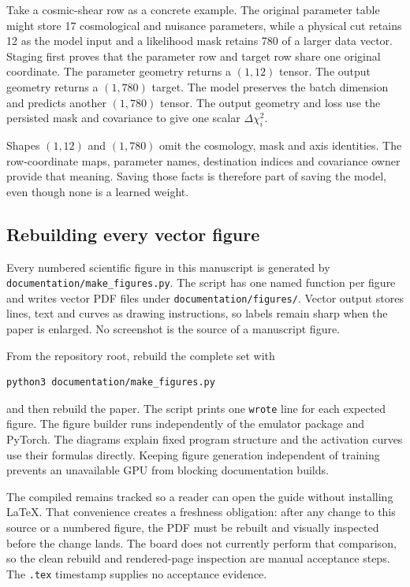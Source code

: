 \documentclass[10pt,aps,prd,twocolumn,nofootinbib]{revtex4-2}
\newcommand{\code}[1]{\texttt{#1}}
\begin{document}
Take a cosmic-shear row as a concrete example.  The original parameter table
might store 17 cosmological and nuisance parameters, while a physical cut
retains 12 as the model input and a likelihood mask retains 780 of a larger
data vector.  Staging first proves that the parameter row and target row share
one original coordinate.  The parameter geometry returns a $(1,12)$ tensor.
The output geometry returns a $(1,780)$ target.  The model preserves the batch
dimension and predicts another $(1,780)$ tensor.  The output geometry and
loss use the persisted mask and covariance to give one scalar
$\Delta\chi_i^2$.

Shapes $(1,12)$ and $(1,780)$ omit the cosmology, mask and axis identities.
The row-coordinate maps, parameter names, destination indices and covariance
owner provide that meaning.  Saving those facts is therefore part of saving
the model, even though none is a learned weight.

\subsection{Rebuilding every vector figure}

Every numbered scientific figure in this manuscript is generated by
\code{documentation/make\_figures.py}.  The script has one named function per
figure and writes vector PDF files under \code{documentation/figures/}.  Vector
output stores lines, text and curves as drawing instructions, so labels
remain sharp when the paper is enlarged.  No screenshot is the source of a
manuscript figure.

From the repository root, rebuild the complete set with
\begin{verbatim}
python3 documentation/make_figures.py
\end{verbatim}
and then rebuild the paper.  The script prints one \code{wrote} line for each
expected figure.  The figure builder runs independently of the emulator
package and PyTorch.  The diagrams explain fixed program structure and the activation curves use
their formulas directly.  Keeping figure generation independent of training
prevents an unavailable GPU from blocking documentation builds.

The compiled  remains tracked so a
reader can open the guide without installing LaTeX.  That convenience creates
a freshness obligation: after any change to this source or a numbered figure,
the PDF must be rebuilt and visually inspected before the change lands.  The
board does not currently perform that comparison, so the clean rebuild and
rendered-page inspection are manual acceptance steps.  The \code{.tex}
timestamp supplies no acceptance evidence.
\end{document}
